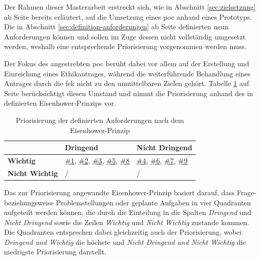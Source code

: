 \documentclass[a4paper,12pt,twoside]{scrreprt}
\begin{document}
Der Rahmen dieser Masterarbeit erstreckt sich, wie in Abschnitt \ref{sec:zielsetzung} ab Seite \pageref{sec:zielsetzung} bereits erläutert, auf die Umsetzung eines \ac{poc} anhand eines Prototyps. Die in Abschnitt \ref{sec:definition-anforderungen} ab Seite \pageref{sec:definition-anforderungen} definierten neun Anforderungen können und sollen im Zuge dessen nicht vollständig umgesetzt werden, weshalb eine entsprechende Priorisierung vorgenommen werden muss.

\medskip

Der Fokus des angestrebten \ac{poc} beruht dabei vor allem auf der Erstellung und Einreichung eines Ethikantrages, während die weiterführende Behandlung eines Antrages durch die \ac{fek} nicht zu den unmittelbaren Zielen gehört. Tabelle \ref{tab:priorisierung-anforderungen} auf Seite \pageref{tab:priorisierung-anforderungen} berücksichtigt diesen Umstand und nimmt die Priorisierung anhand des in \cite{chai_what_2020} definierten Eisenhower-Prinzips vor.

\begin{table}[ht!]
    \centering
    \begin{tabular}{p{.15\linewidth} | p{.35\linewidth} | p{.35\linewidth}}
        & \textbf{Dringend} & \textbf{Nicht Dringend} \\
        \hline
        \textbf{Wichtig} & \hyperref[sub-sub-sec:abgeleitete-anforderungen-vorfeld-antrag]{\#1}, \hyperref[sub-sub-sec:abgeleitete-anforderungen-während-erstellung-einreichung]{\#2}, \hyperref[sub-sub-sec:abgeleitete-anforderungen-während-erstellung-einreichung]{\#3}, \hyperref[sub-sub-sec:abgeleitete-anforderungen-während-erstellung-einreichung]{\#5},  \hyperref[sub-sub-sec:abgeleitete-anforderungen-nach-einreichung]{\#8} & \hyperref[sub-sub-sec:abgeleitete-anforderungen-während-erstellung-einreichung]{\#4}, \hyperref[sub-sub-sec:abgeleitete-anforderungen-während-erstellung-einreichung]{\#6}, \hyperref[sub-sub-sec:abgeleitete-anforderungen-nach-einreichung]{\#7}, \hyperref[sub-sub-sec:abgeleitete-anforderungen-nach-einreichung]{\#9} \\
        \hline
        \textbf{Nicht Wichtig} & / & /
    \end{tabular}
    \caption{Priorisierung der definierten Anforderungen nach dem Eisenhower-Prinzip}
    \label{tab:priorisierung-anforderungen}
\end{table}

Das zur Priorisierung angewandte Eisenhower-Prinzip basiert darauf, dass Frage- beziehungsweise Problemstellungen oder geplante Aufgaben in vier Quadranten aufgeteilt werden können, die durch die Einteilung in die Spalten \textit{Dringend} und \textit{Nicht Dringend} sowie die Zeilen \textit{Wichtig} und \textit{Nicht Wichtig} zustande kommen. Die Quadranten entsprechen dabei gleichzeitig auch der Priorisierung, wobei \textit{Dringend und Wichtig} die höchste und \textit{Nicht Dringend und Nicht Wichtig} die niedrigste Priorisierung darstellt. \cite{chai_what_2020}
\end{document}
